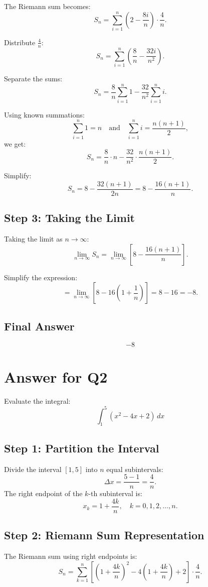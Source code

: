 \documentclass{article}
\begin{document}
The Riemann sum becomes:
\[
S_n = \sum_{i=1}^n \left(2 - \frac{8i}{n}\right) \cdot \frac{4}{n}.
\]

Distribute $\frac{4}{n}$:
\[
S_n = \sum_{i=1}^n \left(\frac{8}{n} - \frac{32i}{n^2}\right).
\]

Separate the sums:
\[
S_n = \frac{8}{n} \sum_{i=1}^n 1 - \frac{32}{n^2} \sum_{i=1}^n i.
\]

Using known summations:
\[
\sum_{i=1}^n 1 = n \quad \text{and} \quad \sum_{i=1}^n i = \frac{n(n+1)}{2},
\]
we get:
\[
S_n = \frac{8}{n} \cdot n - \frac{32}{n^2} \cdot \frac{n(n+1)}{2}.
\]

Simplify:
\[
S_n = 8 - \frac{32(n+1)}{2n} = 8 - \frac{16(n+1)}{n}.
\]

\subsection*{Step 3: Taking the Limit}
Taking the limit as $n \to \infty$:
\[
\lim_{n \to \infty} S_n = \lim_{n \to \infty} \left[8 - \frac{16(n+1)}{n}\right].
\]

Simplify the expression:
\[
= \lim_{n \to \infty} \left[8 - 16\left(1 + \frac{1}{n}\right)\right]
= 8 - 16 = -8.
\]


\subsection*{Final Answer}
\[
\boxed{-8}
\]
\section*{Answer for Q2}
Evaluate the integral:
\[
\int_1^5 (x^2 - 4x + 2) \, dx
\]

\subsection*{Step 1: Partition the Interval}
Divide the interval $[1,5]$ into $n$ equal subintervals:
\[
\Delta x = \frac{5 - 1}{n} = \frac{4}{n}.
\]
The right endpoint of the $k$-th subinterval is:
\[
x_k = 1 + \frac{4k}{n}, \quad k = 0,1,2,\dots,n.
\]

\subsection*{Step 2: Riemann Sum Representation}
The Riemann sum using right endpoints is:
\[
S_n = \sum_{k=1}^{n} \left[ \left(1 + \frac{4k}{n}\right)^2 - 4\left(1 + \frac{4k}{n}\right) + 2 \right] \cdot \frac{4}{n}.
\]
\end{document}
